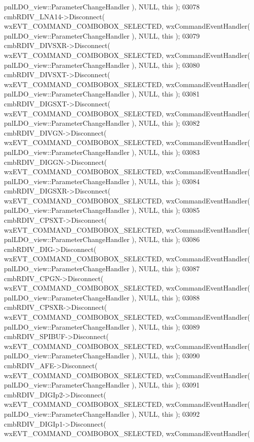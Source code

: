 \begin{DoxyCode}
      pnlLDO_view::ParameterChangeHandler ), NULL, \textcolor{keyword}{this} );
03078     cmbRDIV_LNA14->Disconnect( wxEVT\_COMMAND\_COMBOBOX\_SELECTED, wxCommandEventHandler( 
      pnlLDO_view::ParameterChangeHandler ), NULL, \textcolor{keyword}{this} );
03079     cmbRDIV_DIVSXR->Disconnect( wxEVT\_COMMAND\_COMBOBOX\_SELECTED, wxCommandEventHandler( 
      pnlLDO_view::ParameterChangeHandler ), NULL, \textcolor{keyword}{this} );
03080     cmbRDIV_DIVSXT->Disconnect( wxEVT\_COMMAND\_COMBOBOX\_SELECTED, wxCommandEventHandler( 
      pnlLDO_view::ParameterChangeHandler ), NULL, \textcolor{keyword}{this} );
03081     cmbRDIV_DIGSXT->Disconnect( wxEVT\_COMMAND\_COMBOBOX\_SELECTED, wxCommandEventHandler( 
      pnlLDO_view::ParameterChangeHandler ), NULL, \textcolor{keyword}{this} );
03082     cmbRDIV_DIVGN->Disconnect( wxEVT\_COMMAND\_COMBOBOX\_SELECTED, wxCommandEventHandler( 
      pnlLDO_view::ParameterChangeHandler ), NULL, \textcolor{keyword}{this} );
03083     cmbRDIV_DIGGN->Disconnect( wxEVT\_COMMAND\_COMBOBOX\_SELECTED, wxCommandEventHandler( 
      pnlLDO_view::ParameterChangeHandler ), NULL, \textcolor{keyword}{this} );
03084     cmbRDIV_DIGSXR->Disconnect( wxEVT\_COMMAND\_COMBOBOX\_SELECTED, wxCommandEventHandler( 
      pnlLDO_view::ParameterChangeHandler ), NULL, \textcolor{keyword}{this} );
03085     cmbRDIV_CPSXT->Disconnect( wxEVT\_COMMAND\_COMBOBOX\_SELECTED, wxCommandEventHandler( 
      pnlLDO_view::ParameterChangeHandler ), NULL, \textcolor{keyword}{this} );
03086     cmbRDIV_DIG->Disconnect( wxEVT\_COMMAND\_COMBOBOX\_SELECTED, wxCommandEventHandler( 
      pnlLDO_view::ParameterChangeHandler ), NULL, \textcolor{keyword}{this} );
03087     cmbRDIV_CPGN->Disconnect( wxEVT\_COMMAND\_COMBOBOX\_SELECTED, wxCommandEventHandler( 
      pnlLDO_view::ParameterChangeHandler ), NULL, \textcolor{keyword}{this} );
03088     cmbRDIV_CPSXR->Disconnect( wxEVT\_COMMAND\_COMBOBOX\_SELECTED, wxCommandEventHandler( 
      pnlLDO_view::ParameterChangeHandler ), NULL, \textcolor{keyword}{this} );
03089     cmbRDIV_SPIBUF->Disconnect( wxEVT\_COMMAND\_COMBOBOX\_SELECTED, wxCommandEventHandler( 
      pnlLDO_view::ParameterChangeHandler ), NULL, \textcolor{keyword}{this} );
03090     cmbRDIV_AFE->Disconnect( wxEVT\_COMMAND\_COMBOBOX\_SELECTED, wxCommandEventHandler( 
      pnlLDO_view::ParameterChangeHandler ), NULL, \textcolor{keyword}{this} );
03091     cmbRDIV_DIGIp2->Disconnect( wxEVT\_COMMAND\_COMBOBOX\_SELECTED, wxCommandEventHandler( 
      pnlLDO_view::ParameterChangeHandler ), NULL, \textcolor{keyword}{this} );
03092     cmbRDIV_DIGIp1->Disconnect( wxEVT\_COMMAND\_COMBOBOX\_SELECTED, wxCommandEventHandler( 

\end{DoxyCode}
